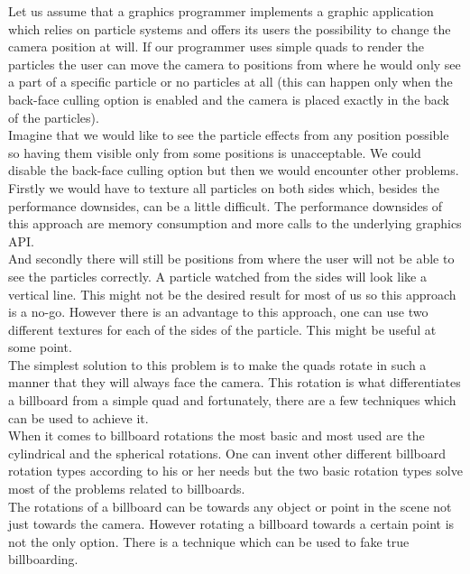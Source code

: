 Let us assume that a graphics programmer implements a graphic application which relies on particle systems and offers its users the possibility to change the camera position at will. If our programmer uses simple quads to render the particles the user can move the camera to positions from where he would only see a part of a specific particle or no particles at all (this can happen only when the back-face culling option is enabled and the camera is placed exactly in the back of the particles).\\

Imagine that we would like to see the particle effects from any position possible so having them visible only from some positions is unacceptable. We could disable the back-face culling option but then we would encounter other problems.\\

Firstly we would have to texture all particles on both sides which, besides the performance downsides, can be a little difficult. The performance downsides of this approach are memory consumption and more calls to the underlying graphics API.\\

And secondly there will still be positions from where the user will not be able to see the particles correctly. A particle watched from the sides will look like a vertical line. This might not be the desired result for most of us so this approach is a no-go. However there is an advantage to this approach, one can use two different textures for each of the sides of the particle. This might be useful at some point.\\

The simplest solution to this problem is to make the quads rotate in such a manner that they will always face the camera. This rotation is what differentiates a billboard from a simple quad and fortunately, there are a few techniques which can be used to achieve it.\\

\newpage
When it comes to billboard rotations the most basic and most used are the cylindrical and the spherical rotations. One can invent other different billboard rotation types according to his or her needs but the two basic rotation types solve most of the problems related to billboards.\\

The rotations of a billboard can be towards any object or point in the scene not just towards the camera. However rotating a billboard towards a certain point is not the only option. There is a technique which can be used to fake true billboarding.\\

